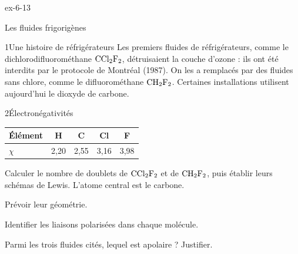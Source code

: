 \begin{blocLivre}{ex-6-13}
\begin{exercice}[3]{Les fluides frigorigènes}
\begin{docu}{1}{Une histoire de réfrigérateurs}
Les premiers fluides de réfrigérateurs, comme le dichlorodifluorométhane $\ce{CCl2F2}$, détruisaient la couche d'ozone : ils ont été
interdits par le protocole de Montréal (1987). On les a remplacés par des fluides sans chlore, comme le difluorométhane
$\ce{CH2F2}$. Certaines installations utilisent aujourd'hui le dioxyde de carbone.
\end{docu}
\begin{docu}{2}{Électronégativités}
\par\smallskip\noindent\hfill\begin{tabular}{lcccc}
\toprule
Élément & H & C & Cl & F \\
\midrule
$\chi$ & 2,20 & 2,55 & 3,16 & 3,98 \\
\bottomrule
\end{tabular}\hfill\null\par\smallskip
\end{docu}
\begin{questions}
\item Calculer le nombre de doublets de $\ce{CCl2F2}$ et de $\ce{CH2F2}$, puis établir leurs schémas de Lewis. L'atome central est le carbone.
\item Prévoir leur géométrie.
\item Identifier les liaisons polarisées dans chaque molécule.
\item \initiative Parmi les trois fluides cités, lequel est apolaire ? Justifier.
\end{questions}
\end{exercice}
\end{blocLivre}
